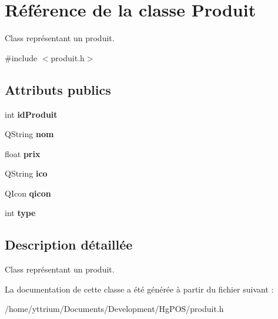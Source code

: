 \hypertarget{classProduit}{}\section{Référence de la classe Produit}
\label{classProduit}


Class représentant un produit.  




{\ttfamily \#include $<$produit.\+h$>$}

\subsection*{Attributs publics}
\begin{DoxyCompactItemize}
\item 
\mbox{\label{classProduit_ad999fe48d24e14d6779a9f03eb5f9b97}} 
int {\bfseries id\+Produit}
\item 
\mbox{\label{classProduit_a582becfbc8aef72c99f83a37642cf7a5}} 
Q\+String {\bfseries nom}
\item 
\mbox{\label{classProduit_a42ef1d4887be85e601553ad082096263}} 
float {\bfseries prix}
\item 
\mbox{\label{classProduit_a688a2383686260a3b2f3b7d51cd2d2e4}} 
Q\+String {\bfseries ico}
\item 
\mbox{\label{classProduit_ac7b21ab414deecfc386addacf78e1bea}} 
Q\+Icon {\bfseries qicon}
\item 
\mbox{\label{classProduit_a193fb38f5b87fae05474a35e6c7a905c}} 
int {\bfseries type}
\end{DoxyCompactItemize}


\subsection{Description détaillée}
Class représentant un produit. 

La documentation de cette classe a été générée à partir du fichier suivant \+:\begin{DoxyCompactItemize}
\item 
/home/yttrium/\+Documents/\+Development/\+Hg\+P\+O\+S/produit.\+h\end{DoxyCompactItemize}
